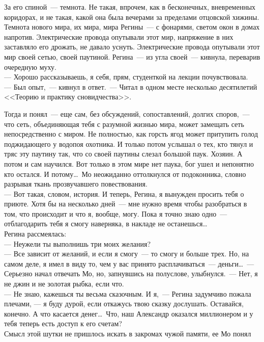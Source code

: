 За его спиной~--- темнота. Не такая, впрочем, как в бесконечных, вневременных 
коридорах, и не такая, какой она была вечерами за пределами отцовской хижины. 
Темнота нового мира, их мира, мира Регины~--- с фонарями, светом окон в домах 
напротив. Электрические провода опутывали этот мир, напряжение в них заставляло 
его дрожать, не давало уснуть. Электрические провода опутывали этот мир своей 
сетью, своей паутиной. Регина~--- из угла своей~--- кивнула, переварив 
очередную 
муху.\\
--- Хорошо рассказываешь, я себя, прям, студенткой на лекции почувствовала.\\
--- Был опыт,~--- кивнул в ответ.~--- Читал в одном месте несколько десятилетий 
<<Теорию и практику сновидчества>>.

Тогда и понял~--- еще сам, без обсуждений, сопоставлений, долгих споров,~--- 
что 
сеть, объединяющая тебя с разумной жизнью мира, может замещать сеть 
непосредственно с миром. Не полностью, как горсть ягод может притупить голод 
поджидающего у водопоя охотника. И только потом услышал о тех, кто тянул и 
тряс эту паутину так, что со своей паутины слезал большой паук. Хозяин. А потом 
и сам научился. Вот только в этом мире нет паука, бог ушел и непонятно кто 
остался. И потому\ldots\ Мо неожиданно оттолкнулся от подоконника, словно 
разрывая 
ткань прозвучавшего повествования.\\
--- Вот такая, словом, история. И теперь, Регина, я вынужден просить тебя о 
приюте. Хотя бы на несколько дней~--- мне нужно время чтобы разобраться в том, 
что 
происходит и что я, вообще, могу. Пока я точно знаю одно~--- отблагодарить тебя 
я 
смогу наверняка, в накладе не останешься\ldots\\
Регина рассмеялась:\\
--- Неужели ты выполнишь три моих желания?\\
--- Все зависит от желаний, и если я смогу~--- то смогу и больше трех. Но, на 
самом 
деле, я имел в виду то, чем у вас принято расплачиваться~--- деньги\ldots~--- 
Серьезно 
начал отвечать Мо, но, запнувшись на полуслове, улыбнулся.~--- Нет, я не джин и 
не 
золотая рыбка, если что.\\
--- Не знаю, кажешься ты весьма сказочным. И я,~--- Регина задумчиво пожала 
плечами, 
--- я буду дурой, если откажусь твою сказку дослушать. Оставайся, конечно. А 
что 
касается денег\ldots\ Что, наш Александр оказался миллионером и у тебя теперь 
есть 
доступ к его счетам?\\
Смысл этой шутки не пришлось искать в закромах чужой памяти, ее Мо понял 
